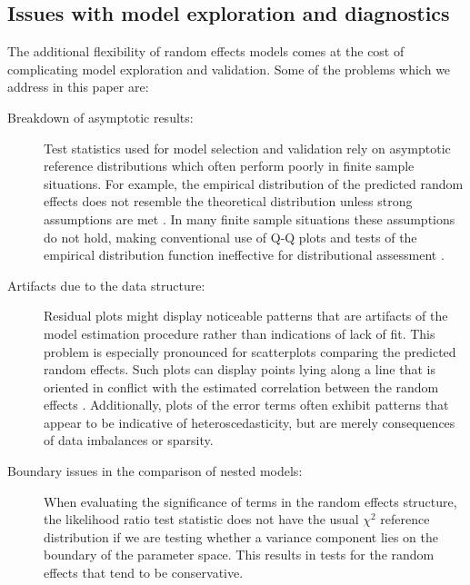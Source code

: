 \documentclass[12pt]{article} %
\newcommand{\hh}[1]{{\color{orange} #1}}
\newcommand{\alnote}[1]{\todo[inline,color=green!40]{#1}} %
\newcommand{\hhnote}[1]{\todo[inline,color=orange!40]{#1}}
\begin{document}
\subsection{Issues with model exploration and diagnostics}
The additional flexibility of random effects models comes at the cost of complicating model exploration and validation. %
Some of the problems which we address in this paper are:
\begin{description}

\item[Breakdown of  asymptotic results: ] Test statistics used for model selection and validation rely on asymptotic reference distributions which often perform poorly in finite sample situations. 
For example, the empirical distribution of the predicted random effects  does not resemble the theoretical distribution unless strong assumptions are met \citep[Theorem 3.2 and Lemma 3.1]{Jiang:1998vt}. In many finite sample situations these assumptions do not hold, making conventional use of Q-Q plots and tests of the empirical distribution function ineffective for distributional assessment \cite[see the supplement of][for supporting simulation results]{adam}.

\item[Artifacts due to the data structure: ] Residual plots might display noticeable patterns that are artifacts of the model estimation procedure rather than indications of lack of fit. 
This problem is especially pronounced for  scatterplots comparing the predicted random effects. Such plots can display points lying along a line that is oriented in conflict with the estimated correlation between the random effects \cite[see][for an example]{Morrell:2000ve}. 
Additionally,  plots of the error terms often exhibit patterns that appear to be indicative of heteroscedasticity, but are merely consequences of data imbalances or sparsity.


\item[Boundary issues  in the comparison of nested models: ] 
When evaluating the significance of terms in the random effects structure, the likelihood ratio test statistic does not have the usual $\chi^2$ reference distribution if we are testing whether a variance component lies on the boundary of the parameter space. This results in tests for the random effects that tend to be conservative.


\end{description}
\end{document}
